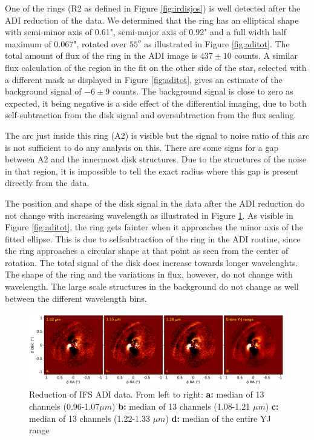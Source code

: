 \documentclass[twoside,single,12pt]{lion-msc}
\begin{document}
One of the rings (R2 as defined in Figure \ref{fig:irdisjos}) is well detected after the ADI reduction of the data. We determined that the ring has an elliptical shape with semi-minor axis of 0.61", semi-major axis of 0.92" and a full width half maximum of 0.067", rotated over $55^o$ as illustrated in Figure \ref{fig:aditot}. The total amount of flux of the ring in the ADI image is $437\pm 10$ counts. A similar flux calculation of the region in the fit on the other side of the star, selected with a different mask as displayed in Figure \ref{fig:aditot}, gives an estimate of the background signal of $-6\pm 9$ counts. The background signal is close to zero as expected, it being negative is a side effect of the differential imaging, due to both self-subtraction from the disk signal and oversubtraction from the flux scaling. 
\bigskip

The arc just inside this ring (A2) is visible but the signal to noise ratio of this arc is not sufficient to do any analysis on this. There are some signs for a gap between A2 and the innermost disk structures. Due to the structures of the noise in that region, it is impossible to tell the exact radius where this gap is present directly from the data. 
\bigskip

The position and shape of the disk signal in the data after the ADI reduction do not change with increasing wavelength as illustrated in Figure \ref{fig:ADIcolor}. As visible in Figure \ref{fig:aditot}, the ring gets fainter when it approaches the minor axis of the fitted ellipse. This is due to selfsubtraction of the ring in the ADI routine, since the ring approaches a circular shape at that point as seen from the center of rotation. The total signal of the disk does increase towards longer wavelenghts. The shape of the ring and the variations in flux, however, do not change with wavelength. The large scale structures in the background do not change as well between the different wavelength bins.

\begin{figure}[htb]
\centering
\includegraphics[trim={0cm 0cm 0cm 0cm},clip,width = 1.01\textwidth]{ADIwavelplot}
\caption{Reduction of IFS ADI data. From left to right: \textbf{a:} median of 13 channels (0.96-1.07$\mu m$) \textbf{b:} median of 13 channels (1.08-1.21 $\mu m$) \textbf{c:} median of 13 channels (1.22-1.33 $\mu m$) \textbf{d:} median of the entire YJ range}
\label{fig:ADIcolor}
\end{figure}
\end{document}
